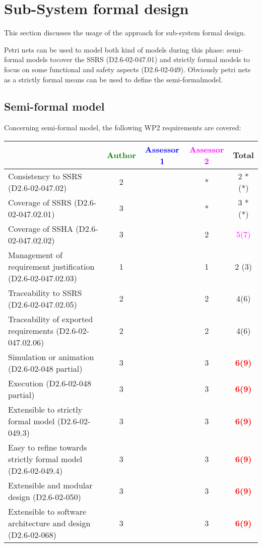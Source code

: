 \section{Sub-System formal design}
This section discusses the usage of the approach for sub-system formal design.

Petri nets can be used to model both kind of models during this phase: semi-formal models tocover the SSRS (D2.6-02-047.01) and strictly formal  models to  focus on some functional and safety aspects (D2.6-02-049).  Obviously petri nets as a strictly  formal means can be used to define the semi-formalmodel.

\subsection{Semi-formal model}

Concerning semi-formal model, the following WP2 requirements are covered:

\begin{tabular}{|l | c | c | c | c|}
\hline
& \textcolor{green}{Author} & \textcolor{blue}{Assessor 1} & \textcolor{magenta}{Assessor 2} & Total \\
\hline 
Consistency to SSRS (D2.6-02-047.02) & 2     & & * & 2 *(*) \\
\hline
Coverage of SSRS (D2.6-02-047.02.01)  & 3     & & * & 3 *(*) \\
\hline
Coverage of SSHA (D2.6-02-047.02.02)  & 3     & & 2     & \textcolor{magenta}{5(7)}  \\
\hline
Management of requirement justification (D2.6-02-047.02.03)  & 1     & & 1     & 2 (3) \\
\hline
Traceability to  SSRS (D2.6-02-047.02.05)  & 2     & & 2     &  4(6) \\
\hline
Traceability of exported requirements (D2.6-02-047.02.06)  & 2     & & 2     &  4(6) \\
\hline
Simulation or animation (D2.6-02-048 partial)  & 3     & & 3     &\textcolor{red}{\textbf{6(9)}}  \\
\hline
Execution (D2.6-02-048 partial)  & 3     & & 3     &\textcolor{red}{\textbf{6(9)}}  \\
\hline
Extensible to strictly formal model (D2.6-02-049.3) & 3     & & 3     &\textcolor{red}{\textbf{6(9)}}  \\
\hline
Easy to  refine towards strictly formal model (D2.6-02-049.4) & 3     & & 3     &\textcolor{red}{\textbf{6(9)}}  \\
\hline
Extensible and modular design (D2.6-02-050)  & 3     & & 3     &\textcolor{red}{\textbf{6(9)}}  \\
\hline
Extensible to software architecture and design (D2.6-02-068)   & 3     & & 3     &\textcolor{red}{\textbf{6(9)}}  \\
\hline
\end{tabular}


